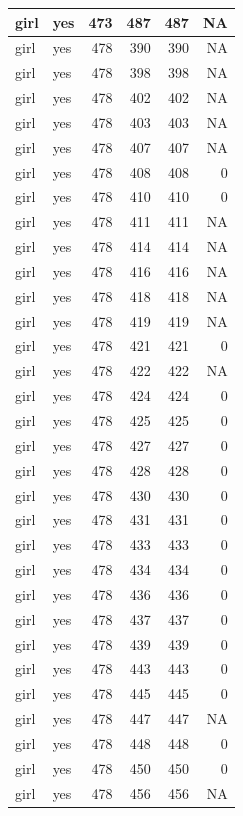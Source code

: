 \documentclass[man]{apa6}
\begin{document}
\begin{tabular}{l|l|r|r|r|r}
\hline
girl & yes & 473 & 487 & 487 & NA\\
\hline
girl & yes & 478 & 390 & 390 & NA\\
\hline
girl & yes & 478 & 398 & 398 & NA\\
\hline
girl & yes & 478 & 402 & 402 & NA\\
\hline
girl & yes & 478 & 403 & 403 & NA\\
\hline
girl & yes & 478 & 407 & 407 & NA\\
\hline
girl & yes & 478 & 408 & 408 & 0\\
\hline
girl & yes & 478 & 410 & 410 & 0\\
\hline
girl & yes & 478 & 411 & 411 & NA\\
\hline
girl & yes & 478 & 414 & 414 & NA\\
\hline
girl & yes & 478 & 416 & 416 & NA\\
\hline
girl & yes & 478 & 418 & 418 & NA\\
\hline
girl & yes & 478 & 419 & 419 & NA\\
\hline
girl & yes & 478 & 421 & 421 & 0\\
\hline
girl & yes & 478 & 422 & 422 & NA\\
\hline
girl & yes & 478 & 424 & 424 & 0\\
\hline
girl & yes & 478 & 425 & 425 & 0\\
\hline
girl & yes & 478 & 427 & 427 & 0\\
\hline
girl & yes & 478 & 428 & 428 & 0\\
\hline
girl & yes & 478 & 430 & 430 & 0\\
\hline
girl & yes & 478 & 431 & 431 & 0\\
\hline
girl & yes & 478 & 433 & 433 & 0\\
\hline
girl & yes & 478 & 434 & 434 & 0\\
\hline
girl & yes & 478 & 436 & 436 & 0\\
\hline
girl & yes & 478 & 437 & 437 & 0\\
\hline
girl & yes & 478 & 439 & 439 & 0\\
\hline
girl & yes & 478 & 443 & 443 & 0\\
\hline
girl & yes & 478 & 445 & 445 & 0\\
\hline
girl & yes & 478 & 447 & 447 & NA\\
\hline
girl & yes & 478 & 448 & 448 & 0\\
\hline
girl & yes & 478 & 450 & 450 & 0\\
\hline
girl & yes & 478 & 456 & 456 & NA\\

\end{tabular}
\end{document}
